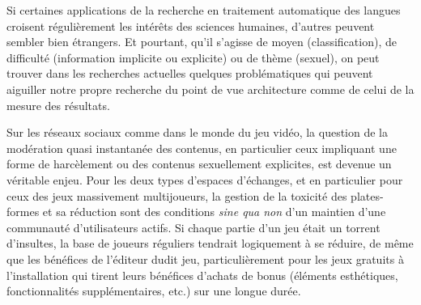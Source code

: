 
Si certaines applications de la recherche en traitement automatique des langues croisent régulièrement les intérêts des sciences humaines, d'autres peuvent sembler bien étrangers. Et pourtant, qu'il s'agisse de moyen (classification), de difficulté (information implicite ou explicite) ou de thème (sexuel), on peut trouver dans les recherches actuelles quelques problématiques qui peuvent aiguiller notre propre recherche du point de vue architecture comme de celui de la mesure des résultats. 

Sur les réseaux sociaux comme dans le monde du jeu vidéo, la question de la modération quasi instantanée des contenus, en particulier ceux impliquant une forme de harcèlement ou des contenus sexuellement explicites, est devenue un véritable enjeu. Pour les deux types d'espaces d'échanges, et en particulier pour ceux des jeux massivement multijoueurs, la gestion de la toxicité des plates-formes et sa réduction sont des conditions \textit{sine qua non} d'un maintien d'une communauté d'utilisateurs actifs. Si chaque partie d'un jeu était un torrent d'insultes, la base de joueurs réguliers tendrait logiquement à se réduire, de même que les bénéfices de l'éditeur dudit jeu, particulièrement pour les jeux gratuits à l'installation qui tirent leurs bénéfices d'achats de bonus (éléments esthétiques, fonctionnalités supplémentaires, etc.) sur une longue durée. 


